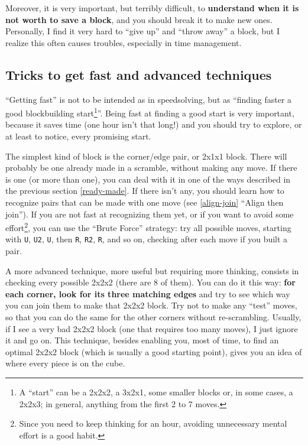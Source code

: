 \documentclass[11pt,a4paper]{book}
\newcommand{\p}{\textquotesingle}
\newcommand{\m}{\texttt}
\begin{document}
Moreover, it is very important, but terribly difficult, to \textbf{understand when it is not worth to save a block}, and you should break it to make new ones. Personally, I find it very hard to ``give up'' and ``throw away'' a block, but I realize this often causes troubles, especially in time management.

\subsection{Tricks to get fast and advanced techniques}

``Getting fast'' is not to be intended as in speedsolving, but as ``finding faster a good blockbuilding start\footnote{A ``start'' can be a 2x2x2, a 3x2x1, some smaller blocks or, in some cases, a 2x2x3; in general, anything from the first 2 to 7 moves.}''. Being fast at finding a good start is very important, because it saves time (one hour isn't that long!) and you should try to explore, or at least to notice, every promising start.

The simplest kind of block is the corner/edge pair, or 2x1x1 block. There will probably be one already made in a scramble, without making any move. If there is one (or more than one), you can deal with it in one of the ways described in the previous section \ref{ready-made}. If there isn't any, you should learn how to recognize pairs that can be made with one move (see \ref{align-join} ``Align then join''). If you are not fast at recognizing them yet, or if you want to avoid some effort\footnote{Since you need to keep thinking for an hour, avoiding unnecessary mental effort is a good habit.}, you can use the ``Brute Force'' strategy: try all possible moves, starting with \m U, \m{U2}, \m{U\p}, then \m R, \m{R2}, \m{R\p}, and so on, checking after each move if you built a pair.

A more advanced technique, more useful but requiring more thinking, consists in checking every possible 2x2x2 (there are 8 of them). You can do it this way: \textbf{for each corner, look for its three matching edges} and try to see which way you can join them to make that 2x2x2 block. Try not to make any ``test'' moves, so that you can do the same for the other corners without re-scrambling. Usually, if I see a very bad 2x2x2 block (one that requires too many moves), I just ignore it and go on. This technique, besides enabling you, most of time, to find an optimal 2x2x2 block (which is usually a good starting point), gives you an idea of where every piece is on the cube.
\end{document}
